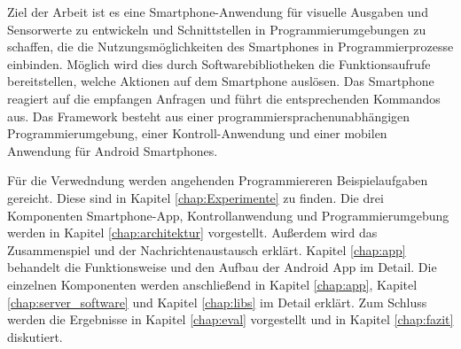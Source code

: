 \documentclass[11pt,a4paper]{report}
\begin{document}
Ziel der Arbeit ist es eine Smartphone-Anwendung für visuelle Ausgaben und Sensorwerte zu entwickeln und Schnittstellen in Programmierumgebungen zu schaffen, die die Nutzungsmöglichkeiten des Smartphones in Programmierprozesse einbinden.
Möglich wird dies durch Softwarebibliotheken die Funktionsaufrufe bereitstellen, welche Aktionen auf dem Smartphone auslösen.
Das Smartphone reagiert auf die empfangen Anfragen und führt die entsprechenden Kommandos aus.
Das Framework besteht aus einer programmiersprachenunabhängigen Programmierumgebung, einer Kontroll-Anwendung und einer mobilen Anwendung für Android Smartphones.

Für die Verwedndung werden angehenden Programmiereren Beispielaufgaben gereicht.
Diese sind in Kapitel \ref{chap:Experimente} zu finden.
Die drei Komponenten Smartphone-App, Kontrollanwendung und Programmierumgebung werden
in Kapitel \ref{chap:architektur} vorgestellt.
Außerdem wird das Zusammenspiel und der Nachrichtenaustausch erklärt.
Kapitel \ref{chap:app} behandelt die Funktionsweise und den Aufbau der Android App im Detail.
Die einzelnen Komponenten werden anschließend in Kapitel \ref{chap:app}, Kapitel \ref{chap:server_software} und Kapitel \ref{chap:libs} im Detail erklärt.
Zum Schluss werden die Ergebnisse in Kapitel \ref{chap:eval} vorgestellt und in Kapitel \ref{chap:fazit} diskutiert.
\end{document}
